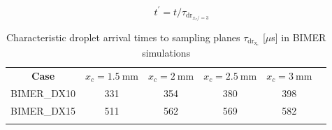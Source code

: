\begin{equation}
\label{eq:t_prime_BIMER_with_tau_drx10}
t^{\prime} = t / \tau_{\mathrm{dr}_{x_c/=3}}
\end{equation}


\begin{table}[!h]
\centering
\caption{Characteristic droplet arrival times to sampling planes $\tau_\mathrm{dr_{x_c}}$ [$\mu$s] in BIMER simulations}
\begin{tabular}{cccccc}
\thickhline
\textbf{Case} &  $x_c = 1.5~\mathrm{mm}$ & $x_c = 2 ~ \mathrm{mm}$ & $x_c = 2.5 ~ \mathrm{mm}$ & $x_c = 3 ~ \mathrm{mm}$ \\
\thickhline 
BIMER\_DX10 & 331 & 354 & 380 & 398 \\
BIMER\_DX15 & 511 & 562 & 569 & 582 \\
\thickhline
\end{tabular}
\label{tab:BIMER_SPS_characteristic_droplet_sampling_times}
\end{table}


